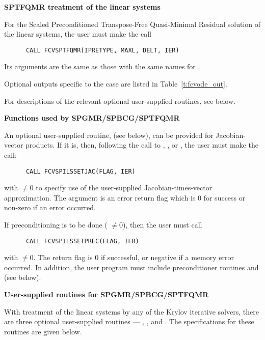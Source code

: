 \begin{Steps}
  {\bf SPTFQMR treatment of the linear systems}
  
  For the Scaled Preconditioned Transpose-Free Quasi-Minimal Residual solution 
  of the linear systems, the user must make the call
\begin{verbatim}
      CALL FCVSPTFQMR(IPRETYPE, MAXL, DELT, IER)
\end{verbatim}
  Its arguments are the same as those with the same names for .

  Optional outputs specific to the {\sptfqmr} case are listed in
  Table~\ref{t:fcvode_out}.

  For descriptions of the relevant optional user-supplied routines, see below.
  

  {\bf Functions used by SPGMR/SPBCG/SPTFQMR}

  An optional user-supplied routine,  (see below), can be provided for
  Jacobian-vector products.  If it is, then, following the call to
  , , or , the user must make the call:
\begin{verbatim}
      CALL FCVSPILSSETJAC(FLAG, IER)
\end{verbatim}
  with  $\neq 0$ to specify use of the user-supplied
  Jacobian-times-vector approximation.
  The argument  is an error return flag which is $0$ 
  for success or non-zero if an error occurred.
  
  If preconditioning is to be done ( $\neq 0$), then the user must call
\begin{verbatim}
      CALL FCVSPILSSETPREC(FLAG, IER)
\end{verbatim}
  with  $\neq 0$.  The return flag  is 0 if
  successful, or negative if a memory error occurred.
  In addition, the user program must include
  preconditioner routines  and  (see below).


 {\bf User-supplied routines for SPGMR/SPBCG/SPTFQMR}

  With treatment of the linear systems by any of the Krylov iterative
  solvers, there are three optional user-supplied routines ---
  , , and .  The specifications
  for these routines are given below.


\end{Steps}
